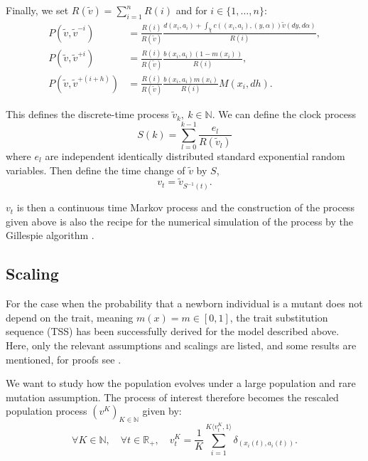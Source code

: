 \documentclass[11pt, a4paper]{article}
\theoremstyle{definition}
\begin{document}
    Finally, we set $R(\tilde{v}) = \sum_{i=1}^n R(i)$ and for $i\in \{1,\ldots,n\}$:
    \begin{align}
        P(\tilde{v},\tilde{v}^{-i}) &= \frac{R(i)}{R(\tilde{v})} \frac{d(x_i,a_i) + \int_{\tilde{\chi}} c((x_i,a_i),(y,\alpha)) \tilde{v}(dy,d\alpha)}{R(i)}, \\
        P(\tilde{v},\tilde{v}^{+i}) &= \frac{R(i)}{R(\tilde{v})} \frac{b(x_i,a_i)(1 - m(x_i))}{R(i)},\\
        P(\tilde{v},\tilde{v}^{+(i+h)}) &= \frac{R(i)}{R(\tilde{v})} \frac{b(x_i,a_i)m(x_i)}{R(i)} M(x_i,dh).
    \end{align}

    This defines the discrete-time process $\tilde{v}_k,~k\in \mathbb{N}$. We can define the clock process
    \begin{equation}
        S(k) = \sum_{l=0}^{k-1} \frac{e_l}{R(\tilde{v}_l)}
    \end{equation}
    where $e_l$ are independent identically distributed standard exponential random variables. Then define the time change of $\tilde{v}$ by $S$,
    \begin{equation}
        v_t = \tilde{v}_{S^{-1}(t)}.
    \end{equation}


     \noindent $v_t$ is then a continuous time Markov process and the construction of the process given above is also the recipe for the numerical simulation of the process by the Gillespie algorithm \autocite{gillespie1976}.

\subsection{Scaling}
    For the case when the probability that a newborn individual is a mutant does not depend on the trait, meaning $m(x) = m \in [0,1]$, the trait substitution sequence (TSS) has been successfully derived for the model described above. Here, only the relevant assumptions and scalings are listed, and some results are mentioned, for proofs see \autocite{meleard2009tss}.

    We want to study how the population evolves under a large population and rare mutation assumption. The process of interest therefore becomes the rescaled population process $(v^K)_{K \in \mathbb{N}}$ given by:
    \begin{equation}
        \forall K\in \mathbb{N},\quad \forall t\in \mathbb{R_+},\quad v_t^K = \frac{1}{K} \sum_{i=1}^{K\langle v_t^K,1 \rangle} \delta_{(x_i(t),a_i(t))}.
    \end{equation}
\end{document}
